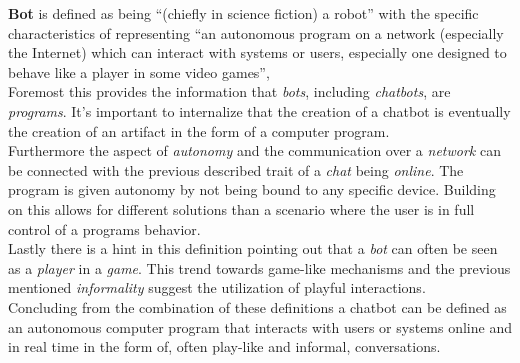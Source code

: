 \textbf{Bot} is defined as being ``(chiefly in science fiction) a robot'' with the specific characteristics of representing ``an autonomous program on a network (especially the Internet) which can interact with systems or users, especially one designed to behave like a player in some video games''\cite{oxfordbot},
\\
Foremost this provides the information that \emph{bots}, including \emph{chatbots}, are \emph{programs}. It's important to internalize that the creation of a chatbot is eventually the creation of an artifact in the form of a computer program.
\\
Furthermore the aspect of \emph{autonomy} and the communication over a \emph{network} can be connected with the previous described trait of a \emph{chat} being \emph{online}. The program is given autonomy by not being bound to any specific device. Building on this allows for different solutions than a scenario where the user is in full control of a programs behavior.
\\
Lastly there is a hint in this definition pointing out that a \emph{bot} can often be seen as a \emph{player} in a \emph{game}. This trend towards game-like mechanisms and the previous mentioned \emph{informality} suggest the utilization of playful interactions.
\\

Concluding from the combination of these definitions a chatbot can be defined as an autonomous computer program that interacts with users or systems online and in real time in the form of, often play-like and informal, conversations.
